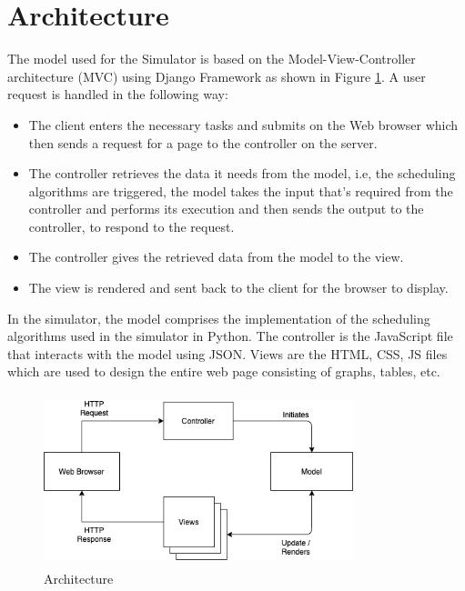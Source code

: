 \documentclass[12pt, conference]{IEEEtran}
\begin{document}
\section{Architecture}
The model used for the Simulator is based on the Model-View-Controller architecture (MVC)\cite{b5} using Django Framework as shown in Figure \ref{architecture}. A user request is handled in the following way:
\begin{itemize}
    \item The client enters the necessary tasks and submits on the Web browser which then sends a request for a page to the controller on the server.
    \item The controller retrieves the data it needs from the model, i.e, the scheduling algorithms are triggered, the model takes the input that's required from the controller and performs its execution and then sends the output to the controller, to respond to the request.
    \item The controller gives the retrieved data from the model to the view.
    \item The view is rendered and sent back to the client for the browser to display.
\end{itemize}
In the simulator, the model comprises the implementation of the scheduling algorithms used in the simulator in Python. The controller is the JavaScript file that interacts with the model using JSON. Views are the HTML, CSS, JS files which are used to design the entire web page consisting of graphs, tables, etc.
\begin{figure}
\centerline{\includegraphics[width=9cm, height=5cm]{RTS_MVC.png}}
\caption{Architecture}
\label{architecture}
\end{figure} 
\end{document}
